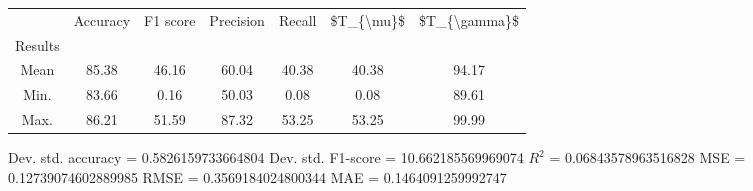 \begin{tabular}{|c|c|c|c|c|c|c|}
\toprule
{} &  Accuracy &  F1 score &  Precision &  Recall &  \$T\_\{\textbackslash mu\}\$ &  \$T\_\{\textbackslash gamma\}\$ \\
Results &           &           &            &         &            &               \\
\hline
Mean    &     85.38 &     46.16 &      60.04 &   40.38 &      40.38 &         94.17 \\
Min.    &     83.66 &      0.16 &      50.03 &    0.08 &       0.08 &         89.61 \\
Max.    &     86.21 &     51.59 &      87.32 &   53.25 &      53.25 &         99.99 \\
\bottomrule
\end{tabular}

 Dev. std. accuracy = 0.5826159733664804
 Dev. std. F1-score = 10.662185569969074
 $R^2$ = 0.06843578963516828
 MSE = 0.12739074602889985
 RMSE = 0.3569184024800344
 MAE = 0.1464091259992747